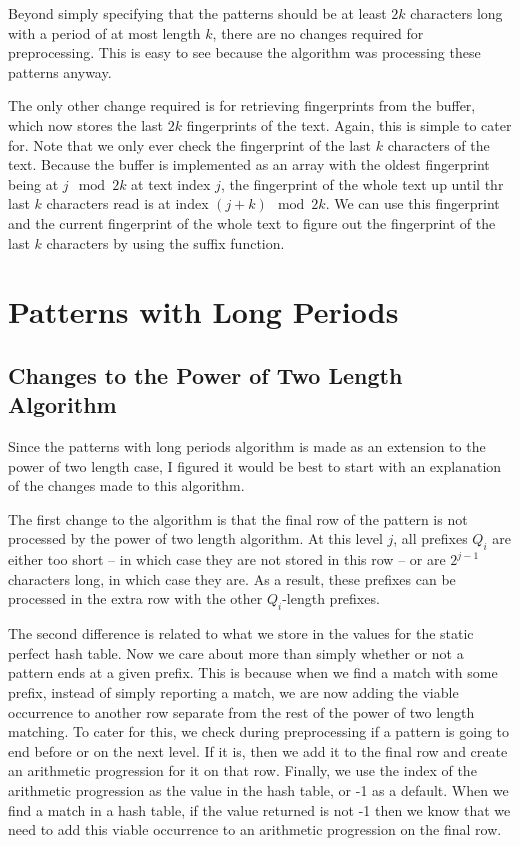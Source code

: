 \documentclass[ %
                    author={Dominic Joseph Moylett},
                    degree={MEng},
                     title={Dictionary Matching with Fingerprints},
                  subtitle={An Empirical Analysis},
                      type={research},
                      year={2015} ]{dissertation}
\begin{document}
Beyond simply specifying that the patterns should be at least $2k$ characters long with a period of at most length $k$, there are no changes required for preprocessing. This is easy to see because the algorithm was processing these patterns anyway.

The only other change required is for retrieving fingerprints from the buffer, which now stores the last $2k$ fingerprints of the text. Again, this is simple to cater for. Note that we only ever check the fingerprint of the last $k$ characters of the text. Because the buffer is implemented as an array with the oldest fingerprint being at $j \mod 2k$ at text index $j$, the fingerprint of the whole text up until thr last $k$ characters read is at index $(j + k) \mod 2k$. We can use this fingerprint and the current fingerprint of the whole text to figure out the fingerprint of the last $k$ characters by using the suffix function.

\section{Patterns with Long Periods}
\label{sec:impl-long}

\subsection{Changes to the Power of Two Length Algorithm}

Since the patterns with long periods algorithm is made as an extension to the power of two length case, I figured it would be best to start with an explanation of the changes made to this algorithm.

The first change to the algorithm is that the final row of the pattern is not processed by the power of two length algorithm. At this level $j$, all prefixes $Q_i$ are either too short -- in which case they are not stored in this row -- or are $2^{j - 1}$ characters long, in which case they are. As a result, these prefixes can be processed in the extra row with the other $Q_i$-length prefixes.

The second difference is related to what we store in the values for the static perfect hash table. Now we care about more than simply whether or not a pattern ends at a given prefix. This is because when we find a match with some prefix, instead of simply reporting a match, we are now adding the viable occurrence to another row separate from the rest of the power of two length matching. To cater for this, we check during preprocessing if a pattern is going to end before or on the next level. If it is, then we add it to the final row and create an arithmetic progression for it on that row. Finally, we use the index of the arithmetic progression as the value in the hash table, or -1 as a default. When we find a match in a hash table, if the value returned is not -1 then we know that we need to add this viable occurrence to an arithmetic progression on the final row.
\end{document}
